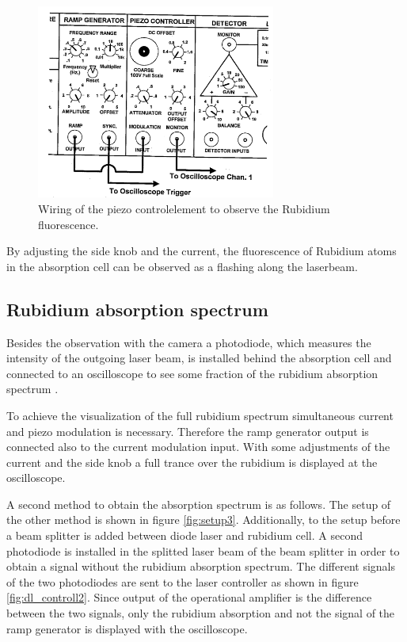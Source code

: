 \begin{figure}
  \centering
  \includegraphics[width=0.7\textwidth]{wiring.png}
  \caption{Wiring of the piezo controlelement to observe the Rubidium fluorescence.\cite{V61}}
  \label{fig:dl_controll}
\end{figure}

By adjusting the side knob and the current,
the fluorescence of Rubidium atoms in the absorption cell
can be observed
as a  flashing along the laserbeam.

\subsection{Rubidium absorption spectrum}
\label{subsec:rubidium_absorption spectrum}

Besides the observation with the camera a photodiode,
which measures the intensity
of the outgoing laser beam,
is installed behind the absorption cell and
connected to an oscilloscope to
see some fraction of the rubidium absorption spectrum .

To achieve the visualization of the full rubidium
spectrum
simultaneous current and piezo modulation
is necessary. Therefore the ramp generator output
is connected also to the current modulation input.
With some adjustments of the current and the side knob
a full trance over the rubidium is displayed at the oscilloscope.

A second method to obtain the absorption spectrum
is as follows.
The setup of the other method is shown in
figure \ref{fig:setup3}.
Additionally, to the setup before a beam splitter is added
between diode laser and rubidium cell.
A second photodiode is installed in the splitted laser beam of the beam splitter
in order to obtain a signal without the rubidium absorption spectrum.
The different signals of the two photodiodes are sent to the
laser controller as shown in figure \ref{fig:dl_controll2}.
Since output of the operational amplifier is
the  difference between the two signals,
only the rubidium absorption and not the signal of the ramp generator is
displayed with the oscilloscope.

